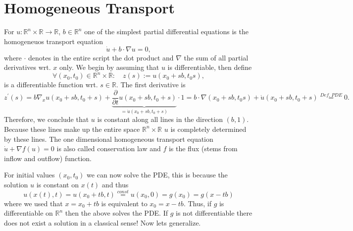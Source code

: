 \documentclass[A4,12pt,twoside]{book}
\begin{document}
\section{Homogeneous Transport}
For $u: \mathbb{R}^n \times \mathbb{R} \to \mathbb{R}$, $b \in \mathbb{R}^n$ one of the simplest partial differential equations is the homogeneuos transport equation 
\[
\dot{u} + b \cdot \nabla u=0,
\]
where $\cdot$ denotes in the entire script the dot product and $\nabla$ the sum of all partial derivatives wrt. $x$ only. We begin by assuming that $u$ is differentiable, then define
\[
\forall (x_0 , t_0) \in \mathbb{R}^n \times \mathbb{R}: \quad z(s) := u (x_0 + sb,t_0 s),
\]
is a differentiable function wrt. $s \in \mathbb{R}$. The first derivative is 
\[
z^\prime (s) =b \nabla_x u(x_0 + sb,t_0+s) +\underbrace{ \frac{\partial}{\partial t} u(x_0 + sb,t_0+s)}_{=\dot{u}(x_0 + sb,t_0+s) } \cdot 1 = b \cdot \nabla (x_0 + sb,t_0 s) + \dot{u}(x_0+sb,t_0+s) \stackrel{Def. \; PDE}{=} 0.
\]
Therefore, we conclude that $u$ is constant along all lines in the direction $(b,1)$. Because these lines make up the entire space $\mathbb{R}^n \times \mathbb{R}$ $u$ is completely determined by these lines.
The one dimensional homogeneous transport equation $\dot{u} + \nabla f(u)=0$ is also called conservation law and $f$ is the flux (stems from inflow and outflow) function.









For initial values $(x_0,t_0)$ we can now solve the PDE, this is because the solution $u$ is constant on $x(t)$ and thus
$$
u(x(t),t)= u(x_0 +tb,t) \stackrel{const}{=} u(x_0,0) = g(x_0) = g(x-tb)
$$
where we used that $x=x_0+tb$ is equivalent to $x_0 =x-tb$. Thus, if $g$ is differentiable on $\mathbb{R}^n$ then the above solves the PDE. If $g$ is not differentiable there does not exist a solution in a classical sense! Now lets generalize.
\end{document}
